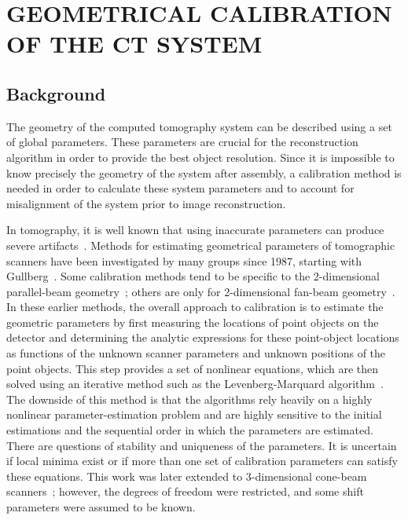 \chapter{GEOMETRICAL CALIBRATION OF THE CT SYSTEM}
\label{chap:calibration}

\section{Background}
The geometry of the computed tomography system can be described using a set of global parameters.  These parameters are crucial for the reconstruction algorithm in order to provide the best object resolution.  Since it is impossible to know precisely the geometry of the system after assembly, a calibration method is needed in order to calculate these system parameters and to account for misalignment of the system prior to image reconstruction.  

In tomography, it is well known that using inaccurate parameters can produce severe artifacts~\citep{Li1994a, Li1994b, Wang1998}. Methods for estimating geometrical parameters of tomographic scanners have been investigated by many groups since 1987, starting with Gullberg~\citep{Gullberg1987}.  Some calibration methods tend to be specific to the 2-dimensional parallel-beam geometry~\citep{Azevedo1990, Busemann1987}; others are only for 2-dimensional fan-beam geometry~\citep{Crawford1988, Hsieh1999, Gullberg1987}.  In these earlier methods, the overall approach to calibration is to estimate the geometric parameters by first measuring the locations of point objects on the detector and determining the analytic expressions for these point-object locations as functions of the unknown scanner parameters and unknown positions of the point objects.  This step provides a set of nonlinear equations, which are then solved using an iterative method such as the Levenberg-Marquard algorithm~\citep{Rougee1993}.  The downside of this method is that the algorithms rely heavily on a highly nonlinear parameter-estimation problem and are highly sensitive to the initial estimations and the sequential order in which the parameters are estimated.  There are questions of stability and uniqueness of the parameters.  It is uncertain if local minima exist or if more than one set of calibration parameters can satisfy these equations.  This work was later extended to 3-dimensional cone-beam scanners~\citep{Gullberg1990}; however, the degrees of freedom were restricted, and some shift parameters were assumed to be known.

